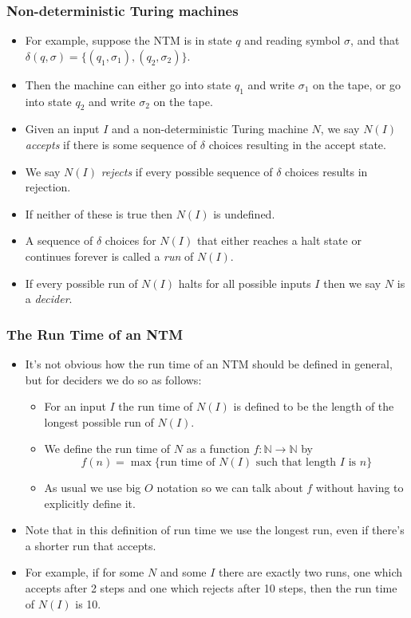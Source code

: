 \documentclass[handout]{beamer}
\begin{document}
\begin{frame}
\frametitle{Non-deterministic Turing machines}
\begin{itemize}
\item For example, suppose the NTM is in state $q$ and reading symbol $\sigma$, and that $\delta(q,\sigma)=\{(q_1,\sigma_1),(q_2,\sigma_2)\}$. 
\item Then the machine can either go into state $q_1$ and write $\sigma_1$ on the tape, or go into state $q_2$ and write $\sigma_2$ on the tape.  

\item Given an input $I$ and a non-deterministic Turing machine $N$, we say $N(I)$ \emph{accepts} if there is some sequence of $\delta$ choices resulting in the accept state. 
\item We say $N(I)$ \emph{rejects} if every possible sequence of $\delta$ choices results in rejection. 
\item If neither of these is true then $N(I)$ is undefined. 
\item A sequence of $\delta$ choices for $N(I)$ that either reaches a halt state or continues forever is called a \emph{run} of $N(I)$. 
\item If every possible run of $N(I)$ halts for all possible inputs $I$ then we say $N$ is a \emph{decider}.
\end{itemize} 
\end{frame}

\begin{frame}
\frametitle{The Run Time of an NTM}
\begin{itemize}
\item It's not obvious how the run time of an NTM should be defined in general, but for deciders we do so as follows:
\begin{itemize} 
\item For an input $I$ the run time of $N(I)$ is defined to be the length of the longest possible run of $N(I)$. 
\item We define the run time of $N$ as a function $f:\mathbb{N}\to \mathbb{N}$ by 
\[f(n)=\max\{ \text{run time of }N(I) \text{ such that length }I \text{ is }n\}\]
\item As usual we use big $O$ notation so we can talk about $f$ without having to explicitly define it.
\end{itemize}
\item Note that in this definition of run time we use the longest run, even if there's a shorter run that accepts. 
\item For example, if for some $N$ and some $I$ there are exactly two runs, one which accepts after 2 steps and one which rejects after 10 steps, then the run time of $N(I)$ is 10. 
\end{itemize}
\end{frame}
\end{document}
